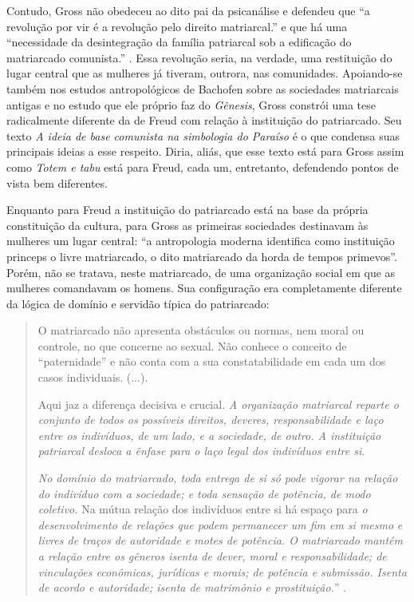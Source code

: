 Contudo, Gross não obedeceu ao dito pai da psicanálise e defendeu que
``a revolução por vir é a revolução pelo direito matriarcal.'' e que há
uma ``necessidade da desintegração da família patriarcal sob a
edificação do matriarcado comunista.'' . Essa revolução seria, na
verdade, uma restituição do lugar central que as mulheres já tiveram,
outrora, nas comunidades. Apoiando-se também nos estudos antropológicos
de Bachofen sobre as sociedades matriarcais antigas e no estudo que ele
próprio faz do \emph{Gênesis}, Gross constrói uma tese radicalmente
diferente da de Freud com relação à instituição do patriarcado. Seu
texto \emph{A ideia de base comunista na simbologia do Paraíso} é o que
condensa suas principais ideias a esse respeito. Diria, aliás, que esse
texto está para Gross assim como \emph{Totem e tabu} está para Freud,
cada um, entretanto, defendendo pontos de vista bem diferentes.

Enquanto para Freud a instituição do patriarcado está na base da própria
constituição da cultura, para Gross as primeiras sociedades destinavam
às mulheres um lugar central: ``a antropologia moderna identifica como
instituição princeps o livre matriarcado, o dito matriarcado da horda de
tempos primevos''. Porém, não se tratava, neste matriarcado, de uma
organização social em que as mulheres comandavam os homens. Sua
configuração era completamente diferente da lógica de domínio e servidão
típica do patriarcado:

\begin{quote}
O matriarcado não apresenta obstáculos ou normas, nem moral ou controle,
no que concerne ao sexual. Não conhece o conceito de ``paternidade'' e
não conta com a sua constatabilidade em cada um dos casos individuais.
(...).

Aqui jaz a diferença decisiva e crucial. \emph{A organização matriarcal
reparte o conjunto de todos os possíveis direitos, deveres,
responsabilidade e laço entre os indivíduos, de um lado, e a sociedade,
de outro. A instituição patriarcal desloca a ênfase para o laço legal
dos indivíduos entre si}.

\emph{No domínio do matriarcado, toda entrega de si só pode vigorar na
relação do indivíduo com a sociedade; e toda sensação de potência, de
modo coletivo.} Na mútua relação dos indivíduos entre si há espaço para
\emph{o desenvolvimento de relações que podem permanecer um fim em si
mesmo} \emph{e livres de traços de autoridade e motes de potência. O
matriarcado mantém a relação entre os gêneros isenta de dever, moral e
responsabilidade; de vinculações econômicas, jurídicas e morais; de
potência e submissão. Isenta de acordo e autoridade; isenta de
matrimônio e prostituição.}'' .
\end{quote}

